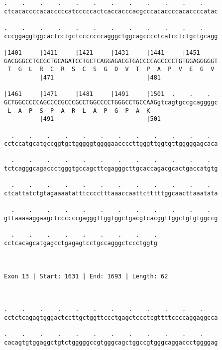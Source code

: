 \documentclass{article}
\begin{document}
\begin{Verbatim}
.    .    .    .    .    .    .    .    .    .    .    .    
ctcacaccccacacccccatcccccactcaccacccacgcccacaccccacaccccatac
                                                            
.    .    .    .    .    .    .    .    .    .    .    .    
cccggaggtggcactcctgctcccccccagggctggcagcccctcatcctctgctgcagg
                                                            
|1401     |1411     |1421     |1431     |1441     |1451     
GACGGGCCTGCGCTGCAGATCCTGCTCAGGAGACGTGACCCCAGCCCCTGTGGAGGGGGT
 T  G  L  R  C  R  S  C  S  G  D  V  T  P  A  P  V  E  G  V 
          |471                          |481                
  
|1461     |1471     |1481     |1491     |1501  .    .    .  
GCTGGCCCCCAGCCCCGCCCGCCTGGCCCCTGGGCCTGCCAAGgtcagtgccgcaggggc
 L  A  P  S  P  A  R  L  A  P  G  P  A  K                   
          |491                          |501                
  
  .    .    .    .    .    .    .    .    .    .    .    .  
cctccatgcatgccggtgctgggggtggggaaccccttgggttggtgttgggggagcaca
                                                            
  .    .    .    .    .    .    .    .    .    .    .    .  
tctcagggcagaccctgggtgccagcttcgagggcttgcaccagacgcactgaccatgtg
                                                            
  .    .    .    .    .    .    .    .    .    .    .    .  
ctcattatctgtagaaaatatttcccctttaaaccaattctttttggcaacttaaatata
                                                            
  .    .    .    .    .    .    .    .    .    .    .    .  
gttaaaaaggaagctccccccgagggttggtggctgacgtcacggttggctgtgtggccg
                                                            
  .    .    .    .    .    .    .    .    .
cctcacagcatgagcctgagagtcctgccagggctccctggtg
                                           
                                           
 
Exon 13 | Start: 1631 | End: 1693 | Length: 62



.    .    .    .    .    .    .    .    .    .    .    .    
cctctcagagtgggactccttgctggttccctgagctccctcgttttccccaggaggcca
                                                            
.    .    .    .    .    .    .    .    .    .    .    .    
cacagtgtggaggctgtctgggggccgtgggcagctggccgtgggcaggaccctggggag
                                                            

\end{Verbatim}
\end{document}
